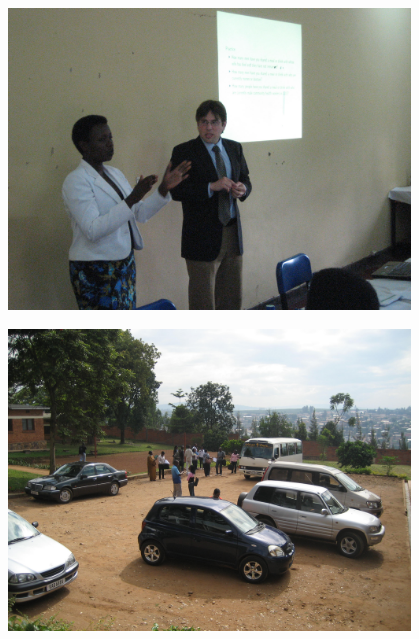\documentclass[aspectratio=169]{beamer}
\begin{document}
\begin{frame}

\begin{center}
\includegraphics[width=0.8\textwidth]{figures/rwanda_matt_teaching.jpg}
\end{center}

\end{frame}
\begin{frame}

\begin{center}
\includegraphics[width=0.8\textwidth]{figures/rwanda_interviewer_bus.jpg}
\end{center}

\end{frame}
\end{document}
